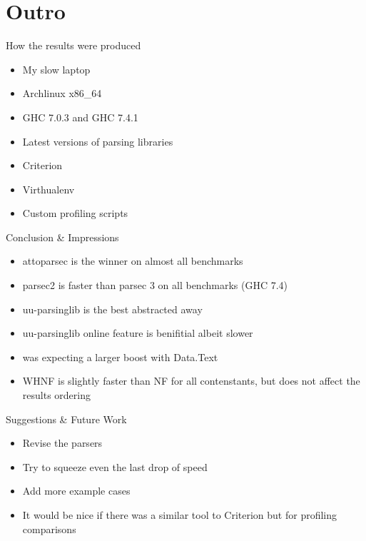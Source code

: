 \documentclass{beamer}
\begin{document}
\section{Outro}

\begin{frame}{How the results were produced}
\begin{itemize}
\item My slow laptop
\item Archlinux x86\_64
\item GHC 7.0.3 and GHC 7.4.1
\item Latest versions of parsing libraries
\item Criterion
\item Virthualenv
\item Custom profiling scripts
\end{itemize}
\end{frame}

\begin{frame}{Conclusion \& Impressions}
\begin{itemize}
\item attoparsec is the winner on almost all benchmarks
\item parsec2 is faster than parsec 3 on all benchmarks (GHC 7.4)
\item uu-parsinglib is the best abstracted away
\item uu-parsinglib online feature is benifitial albeit slower
\item was expecting a larger boost with Data.Text 
\item WHNF is slightly faster than NF for all contenstants, but does not affect the results ordering
\end{itemize}

\end{frame}

\begin{frame}{Suggestions \& Future Work}
\begin{itemize}
\item Revise the parsers
\item Try to squeeze even the last drop of speed
\item Add more example cases
\item It would be nice if there was a similar tool to Criterion
but for profiling comparisons
\end{itemize}
\end{frame}
\end{document}
